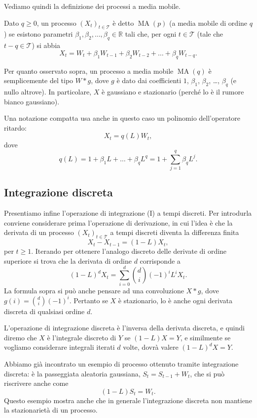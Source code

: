 \documentclass[
  italian,
  letterpaper,
]{book}
\newcommand{\R}{\mathbb{R}}
\theoremstyle{definition}
\theoremstyle{remark}
\begin{document}
Vediamo quindi la definizione dei processi a media mobile.

Dato \(q \ge 0\), un processo \((X_t)_{t \in \mathcal{T}}\) è detto
\(\operatorname{MA}(p)\) (a media mobile di ordine \(q\)) se esistono
parametri \(\beta_1, \beta_2, \ldots, \beta_q \in \R\) tali che, per
ogni \(t \in \mathcal{T}\) (tale che \(t-q \in \mathcal{T}\)) si abbia
\[ X_t = W_t + \beta_1 W_{t-1} + \beta_2 W_{t-2}+ \ldots + \beta_q W_{t-q }.\]

Per quanto osservato sopra, un processo a media mobile
\(\operatorname{MA}(q)\) è semplicemente del tipo \(W * g\), dove \(g\)
è dato dai coefficienti \(1\), \(\beta_1\), \(\beta_2\), \ldots,
\(\beta_q\) (e nullo altrove). In particolare, \(X\) è gaussiano e
stazionario (perché lo è il rumore bianco gaussiano).

Una notazione compatta usa anche in questo caso un polinomio
dell'operatore ritardo: \[ X_t = q(L)W_t,\] dove
\[ q(L ) = 1 + \beta_1 L + \ldots + \beta_q L^q = 1 + \sum_{j=1}^q \beta_q L^j.\]

\subsection{Integrazione discreta}\label{integrazione-discreta}

Presentiamo infine l'operazione di integrazione (I) a tempi discreti.
Per introdurla conviene considerare prima l'operazione di derivazione,
in cui l'idea è che la derivata di un processo
\((X_t)_{t\in \mathcal{T}}\) a tempi discreti diventa la differenza
finita \[ X_t - X_{t-1} = (1-L)X_t,\] per \(t \ge 1\). Iterando per
ottenere l'analogo discreto delle derivate di ordine superiore si trova
che la derivata di ordine \(d\) corrisponde a
\[ (1-L)^d X_t = \sum_{i=0}^d { d \choose i} (-1)^i L^i X_t.\] La
formula sopra si può anche pensare ad una convoluzione \(X * g\), dove
\(g(i) = { d \choose i} (-1)^i\). Pertanto se \(X\) è stazionario, lo è
anche ogni derivata discreta di qualsiasi ordine \(d\).

L'operazione di integrazione discreta è l'inversa della derivata
discreta, e quindi diremo che \(X\) è l'integrale discreto di \(Y\) se
\((1-L)X = Y\), e similmente se vogliamo considerare integrali iterati
\(d\) volte, dovrà valere \((1-L)^d X = Y\).

Abbiamo già incontrato un esempio di processo ottenuto tramite
integrazione discreta: è la passeggiata aleatoria gaussiana,
\(S_t = S_{t-1} + W_t\), che si può riscrivere anche come
\[ (1-L) S _t  =W_t.\] Questo esempio mostra anche che in generale
l'integrazione discreta non mantiene la stazionarietà di un processo.
\end{document}
